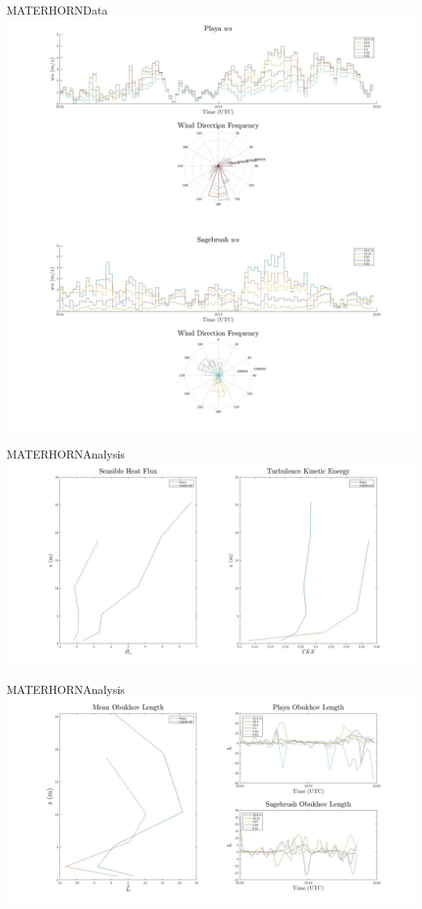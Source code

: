 \documentclass{beamer}
\begin{document}
\begin{frame}{MATERHORN}{Data}
	\includegraphics[width=\linewidth]{plots/playawind}
	\endminipage\hfill
	\includegraphics[width=\linewidth]{plots/sagewind}
	\endminipage\hfill
\end{frame}

\begin{frame}{MATERHORN}{Analysis}
	\includegraphics[width=\linewidth]{plots/hstke}
\end{frame}

\begin{frame}{MATERHORN}{Analysis}
	\includegraphics[width=\linewidth]{plots/oblength}
\end{frame}
\end{document}
